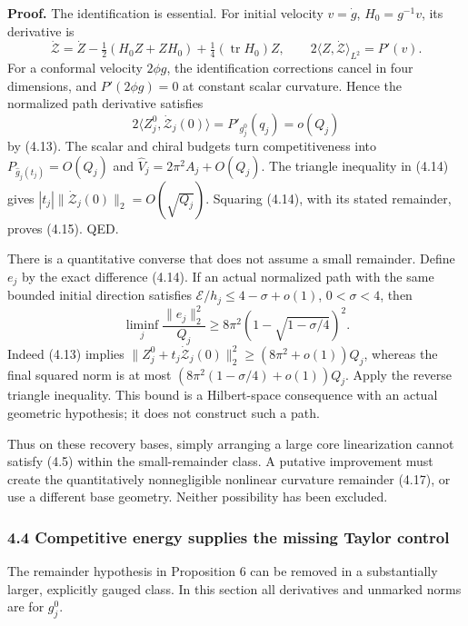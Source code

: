 \documentclass[
  11pt,
]{article}
\begin{document}
\textbf{Proof.} The identification is essential. For initial velocity
\(v=\dot g\), \(H_0=g^{-1}v\), its derivative is \[
 \dot{\mathcal Z}
   =\dot Z-\tfrac12(H_0Z+ZH_0)
                   +\tfrac14(\operatorname{tr}H_0)Z,\qquad
 2\langle Z,\dot{\mathcal Z}\rangle_{L^2}=P'(v). \tag{4.16}
\] For a conformal velocity \(2\phi g\), the identification corrections
cancel in four dimensions, and \(P'(2\phi g)=0\) at constant scalar
curvature. Hence the normalized path derivative satisfies \[
 2\langle Z_j^0,\dot{\mathcal Z}_j(0)\rangle
   =P'_{g_j^0}(q_j)=o(Q_j)
\] by (4.13). The scalar and chiral budgets turn competitiveness into
\(P_{\widehat g_j(t_j)}=O(Q_j)\) and \(\widehat V_j=2\pi^2A_j+O(Q_j)\).
The triangle inequality in (4.14) gives
\(|t_j|\|\dot{\mathcal Z}_j(0)\|_2=O(\sqrt{Q_j})\). Squaring (4.14),
with its stated remainder, proves (4.15). QED.

There is a quantitative converse that does not assume a small remainder.
Define \(e_j\) by the exact difference (4.14). If an actual normalized
path with the same bounded initial direction satisfies
\(\mathcal E/h_j\le4-\sigma+o(1)\), \(0<\sigma<4\), then \[
 \boxed{\liminf_j\frac{\|e_j\|_2^2}{Q_j}
 \ge8\pi^2\left(1-\sqrt{1-\sigma/4}\right)^2.} \tag{4.17}
\] Indeed (4.13) implies
\(\|Z_j^0+t_j\dot{\mathcal Z}_j(0)\|_2^2 \ge(8\pi^2+o(1))Q_j\), whereas
the final squared norm is at most \((8\pi^2(1-\sigma/4)+o(1))Q_j\).
Apply the reverse triangle inequality. This bound is a Hilbert-space
consequence with an actual geometric hypothesis; it does not construct
such a path.

Thus on these recovery bases, simply arranging a large core
linearization cannot satisfy (4.5) within the small-remainder class. A
putative improvement must create the quantitatively nonnegligible
nonlinear curvature remainder (4.17), or use a different base geometry.
Neither possibility has been excluded.

\hypertarget{competitive-energy-supplies-the-missing-taylor-control}{%
\subsubsection{4.4 Competitive energy supplies the missing Taylor
control}\label{competitive-energy-supplies-the-missing-taylor-control}}

The remainder hypothesis in Proposition 6 can be removed in a
substantially larger, explicitly gauged class. In this section all
derivatives and unmarked norms are for \(g_j^0\).
\end{document}
